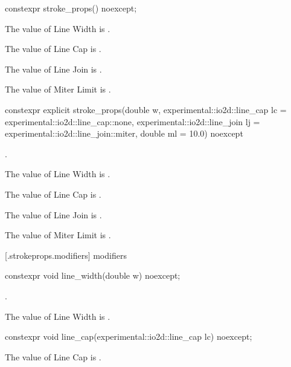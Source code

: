 \begin{itemdecl}
constexpr stroke_props() noexcept;
\end{itemdecl}
\begin{itemdescr}
\pnum
\effects
The value of Line Width is .

\pnum
The value of Line Cap is .

\pnum
The value of Line Join is .

\pnum
The value of Miter Limit is .
\end{itemdescr}

\begin{itemdecl}
constexpr explicit stroke_props(double w,
  experimental::io2d::line_cap lc = experimental::io2d::line_cap::none,
  experimental::io2d::line_join lj = experimental::io2d::line_join::miter,
  double ml = 10.0) noexcept    
\end{itemdecl}
\begin{itemdescr}
\pnum
\requires
{}.

\pnum
{}

\pnum
\effects
The value of Line Width is .

\pnum
The value of Line Cap is .

\pnum
The value of Line Join is .

\pnum
The value of Miter Limit is .
\end{itemdescr}

 [\iotwod.strokeprops.modifiers] { modifiers}

\begin{itemdecl}
constexpr void line_width(double w) noexcept;
\end{itemdecl}
\begin{itemdescr}
\pnum
\requires
{}.

\pnum
\effects
The value of Line Width is .
\end{itemdescr}

\begin{itemdecl}
constexpr void line_cap(experimental::io2d::line_cap lc) noexcept;
\end{itemdecl}
\begin{itemdescr}
\pnum
\effects
The value of Line Cap is .
\end{itemdescr}

